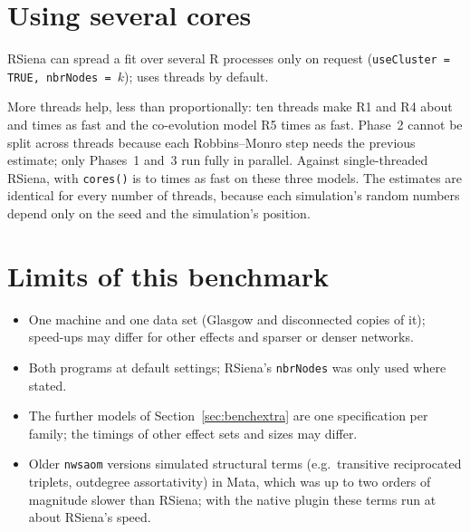 \section{Using several cores}

RSiena can spread a fit over several R processes only on request
(\texttt{useCluster = TRUE, nbrNodes = $k$}); \nwsaom{} uses threads by default.



More threads help, less than proportionally: ten threads make R1 and R4 about
\coresRone{} and \coresRfour{} times as fast and the co-evolution model R5
\coresRfive{} times as fast. Phase~2 cannot be split across threads because each
Robbins--Monro step needs the previous estimate; only Phases~1 and~3 run fully in parallel.
Against single-threaded RSiena, \nwsaom{} with \texttt{cores(\coresmaxthreads)} is
\coresvsrsmin{} to \coresvsrsmax{} times as fast on these three models. The
estimates are identical for every number of threads, because each simulation's
random numbers depend only on the seed and the simulation's position.

\section{Limits of this benchmark}

\begin{itemize}
\item One machine and one data set (Glasgow and disconnected copies of it);
      speed-ups may differ for other effects and sparser or denser networks.
\item Both programs at default settings; RSiena's \texttt{nbrNodes} was only used
      where stated.
\item The further models of Section~\ref{sec:benchextra} are one specification per family; the timings of other effect sets and sizes may differ.
\item Older \texttt{nwsaom} versions simulated structural terms (e.g.\ transitive
      reciprocated triplets, outdegree assortativity) in Mata, which was up to
      two orders of magnitude slower than RSiena; with the native plugin these
      terms run at about RSiena's speed.
\end{itemize}
